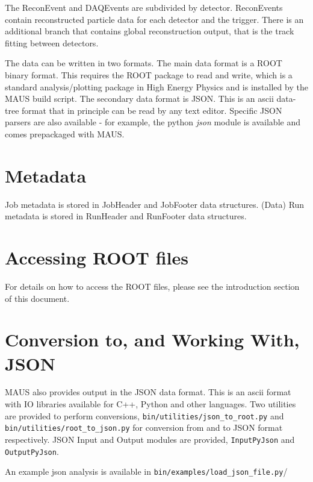 The ReconEvent and DAQEvents are subdivided by detector. ReconEvents contain reconstructed particle data for each detector and the trigger. There is an additional branch that contains global reconstruction output, that is the track fitting between detectors.

The data can be written in two formats. The main data format is a ROOT binary format. This requires the ROOT package to read and write, which is a standard analysis/plotting package in High Energy Physics and is installed by the MAUS build script. The secondary data format is JSON. This is an ascii data-tree format that in principle can be read by any text editor. Specific JSON parsers are also available - for example, the python \emph{json} module is available and comes prepackaged with MAUS.

\section{Metadata}
Job metadata is stored in JobHeader and JobFooter data structures. (Data) Run metadata is stored in RunHeader and RunFooter data structures.

\section{Accessing ROOT files}
For details on how to access the ROOT files, please see the introduction section of this document.

\section{Conversion to, and Working With, JSON}
MAUS also provides output in the JSON data format. This is an ascii format with IO libraries available for C++, Python and other languages. Two utilities are provided to perform conversions, \verb|bin/utilities/json_to_root.py| and \verb|bin/utilities/root_to_json.py| for conversion from and to JSON format respectively. JSON Input and Output modules are provided, \verb|InputPyJson| and \verb|OutputPyJson|.

An example json analysis is available in \verb|bin/examples/load_json_file.py|/

